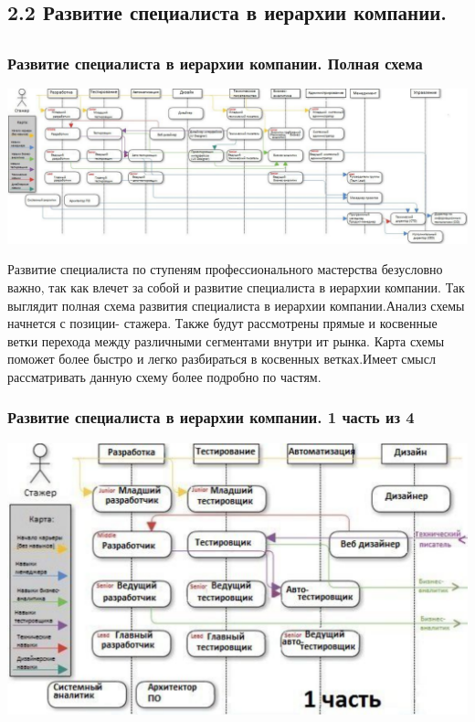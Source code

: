\documentclass{../industrial-development}
\begin{document}

\subsection{2.2 Развитие  специалиста в иерархии компании.  }

\subsection{}

\begin{frame} \frametitle{Развитие  специалиста в иерархии компании. Полная схема }
  \centerline{\includegraphics[height=0.47\textheight]{11-IT-specialist's-way/sch.pdf}}
\end{frame}

\lecturenotes
Развитие  специалиста по ступеням профессионального мастерства безусловно важно, так как влечет за собой и развитие специалиста в иерархии компании.
Так выглядит полная схема развития специалиста в иерархии компании.Анализ схемы начнется с позиции- стажера. Также  будут рассмотрены прямые и косвенные ветки перехода между различными сегментами внутри ит рынка. Карта схемы поможет более быстро и легко разбираться в косвенных ветках.Имеет смысл рассматривать данную схему более подробно по частям.

\begin{frame} \frametitle{Развитие  специалиста в иерархии компании. 1 часть из 4 }
  \centerline{\includegraphics[width=1\linewidth]{11-IT-specialist's-way/sch11.pdf}}
\end{frame}
\end{document}
